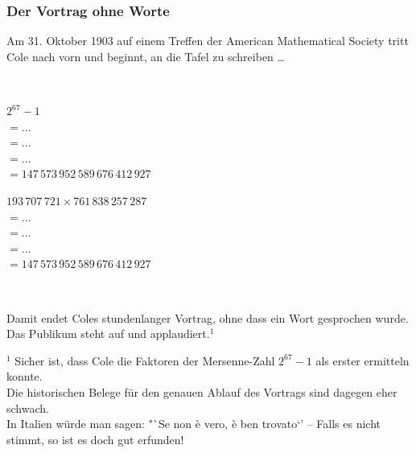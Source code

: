\documentclass[aspectratio=1610,onlymath]{beamer}
\begin{document}
\begin{frame}\frametitle{Der Vortrag ohne Worte}

Am 31. Oktober 1903 auf einem Treffen der American Mathematical Society tritt Cole nach vorn und beginnt,
an die Tafel zu schreiben \ldots \bigskip\pause

~\hfill
\begin{minipage}{6.5cm}
$2^{67}-1$\\\pause
$= \ldots$\\\pause
$= \ldots$\\\pause
$= \ldots$\\\pause
$= 147\,573\,952\,589\,676\,412\,927$\pause
\end{minipage}
\begin{minipage}{6.5cm}
$193\,707\,721 \times 761\,838\,257\,287$\\\pause
$= \ldots$\\\pause
$= \ldots$\\\pause
$= \ldots$\\\pause
$= 147\,573\,952\,589\,676\,412\,927$\pause
\end{minipage}
\hfill~
\bigskip

Damit endet Coles stundenlanger Vortrag, ohne dass ein Wort gesprochen wurde.\\
Das Publikum steht auf und applaudiert.$^1$\medskip

{\tiny $^1$ Sicher ist, dass Cole die Faktoren der Mersenne-Zahl $2^{67}-1$ als erster ermitteln konnte.\\
Die historischen Belege für den genauen Ablauf des Vortrags sind dagegen eher schwach.\\
In Italien würde man sagen: "`Se non è vero, è ben trovato`' -- Falls es nicht stimmt, so ist es doch gut erfunden!

}

\end{frame}
\end{document}
